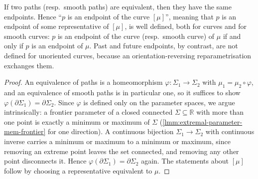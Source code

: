\begin{lemma}
    \label{lmm:curve-endpoint-well-defined}
    \leanok
    If two paths (resp.\ smooth paths) are equivalent, then they have the same endpoints. Hence ``$p$ is an endpoint of the curve $[\mu]$'', meaning that $p$ is an endpoint of some representative of $[\mu]$, is well defined, both for curves and for smooth curves: $p$ is an endpoint of the curve (resp.\ smooth curve) of $\mu$ if and only if $p$ is an endpoint of $\mu$. Past and future endpoints, by contrast, are not defined for unoriented curves, because an orientation-reversing reparametrisation exchanges them.
\end{lemma}
\begin{proof}
    \leanok
    An equivalence of paths is a homeomorphism $\varphi : \Sigma_1 \to \Sigma_2$ with $\mu_1 = \mu_2 \circ \varphi$, and an equivalence of smooth paths is in particular one, so it suffices to show $\varphi(\partial\Sigma_1) = \partial\Sigma_2$. Since $\varphi$ is defined only on the parameter spaces, we argue intrinsically: a frontier parameter of a closed connected $\Sigma \subseteq \mathbb{R}$ with more than one point is exactly a minimum or maximum of $\Sigma$ (\ref{lmm:extremal-parameter-mem-frontier} for one direction). A continuous bijection $\Sigma_1 \to \Sigma_2$ with continuous inverse carries a minimum or maximum to a minimum or maximum, since removing an extreme point leaves the set connected, and removing any other point disconnects it. Hence $\varphi(\partial\Sigma_1) = \partial\Sigma_2$ again. The statements about $[\mu]$ follow by choosing a representative equivalent to $\mu$.
\end{proof}

